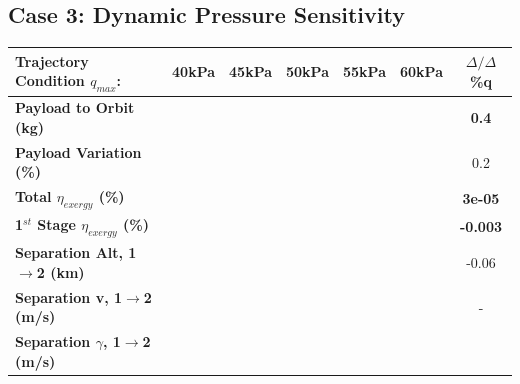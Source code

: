 \subsection{Case 3: Dynamic Pressure Sensitivity}\label{sec:qvariation}


\begin{table}[ht!]
	\centering
	\begin{tabular}{l c c c c c c} 
		\hline \textbf{Trajectory Condition  \qquad  $q_{max}$: }
		&40kPa
		&45kPa
		&50kPa
		& 55kPa
		& 60kPa
		& $\Delta/\Delta$\%q
		\\
		\hline \textbf{Payload to Orbit (kg)}
		& \textbf{\PayloadToOrbitqFortyNoReturn}
		& \textbf{\PayloadToOrbitqFortyFiveNoReturn}
		& \textbf{\PayloadToOrbitqStandardNoReturn}
		& \textbf{\PayloadToOrbitqFiftyFiveNoReturn}
		& \textbf{\PayloadToOrbitqSixtyNoReturn}
		&\textbf{0.4}
		\\
		\textbf{Payload Variation (\%)}
		& \PayloadVarqFortyNoReturn
		& \PayloadVarqFortyFiveNoReturn
		& \PayloadVarqStandardNoReturn
		& \PayloadVarqFiftyFiveNoReturn
		& \PayloadVarqSixtyNoReturn
		&0.2
		\\
		\textbf{Total $\eta_{exergy}$ (\%)}
		& \textbf{\totalExergyEffqFortyNoReturn}
		& \textbf{\totalExergyEffqFortyFiveNoReturn}
		& \textbf{\totalExergyEffqStandardNoReturn}
		& \textbf{\totalExergyEffqFiftyFiveNoReturn}
		& \textbf{\totalExergyEffqSixtyNoReturn}
		& \textbf{3e-05}
		\\
		\hline 
		\textbf{1$^{st}$ Stage $\eta_{exergy}$ (\%)}
		& \textbf{\firstExergyEffqFortyNoReturn}
		& \textbf{\firstExergyEffqFortyFiveNoReturn}
		& \textbf{\firstExergyEffqStandardNoReturn}
		& \textbf{\firstExergyEffqFiftyFiveNoReturn}
		& \textbf{\firstExergyEffqSixtyNoReturn}
		& \textbf{-0.003}
		\\
		\textbf{Separation Alt, 1$\rightarrow$2 (km)}
		& \firstsecondSeparationAltqFortyNoReturn
		& \firstsecondSeparationAltqFortyFiveNoReturn
		& \firstsecondSeparationAltqStandardNoReturn
		& \firstsecondSeparationAltqFiftyFiveNoReturn
		& \firstsecondSeparationAltqSixtyNoReturn
		&-0.06
		\\
		\textbf{Separation v, 1$\rightarrow$2 (m/s)}
		& \firstsecondSeparationvqFortyNoReturn
		& \firstsecondSeparationvqFortyFiveNoReturn
		& \firstsecondSeparationvqStandardNoReturn
		& \firstsecondSeparationvqFiftyFiveNoReturn
		& \firstsecondSeparationvqSixtyNoReturn
		& -
		\\
		\textbf{Separation $\gamma$, 1$\rightarrow$2 (m/s)}
		& \firstsecondSeparationgammaqFortyNoReturn
		& \firstsecondSeparationgammaqFortyFiveNoReturn

\end{tabular}
\end{table}
